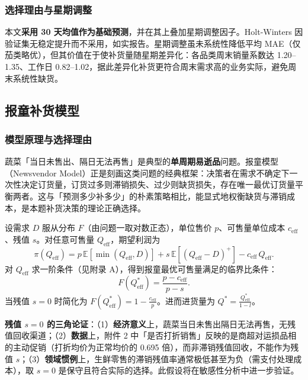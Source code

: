 \documentclass[12pt]{ctexart}
\begin{document}
\subsubsection{选择理由与星期调整}
本文\textbf{采用 30 天均值作为基础预测}，并在其上叠加星期调整因子。Holt-Winters 因验证集无稳定提升而不采用，如实报告。星期调整虽未系统性降低平均 MAE（仅茄类略优），但其价值在于使补货量随星期差异化：各品类周末销量系数达 1.20--1.35、工作日 0.82--1.02，据此差异化补货更符合周末需求高的业务实际，避免周末系统性缺货。

\subsection{报童补货模型}

\subsubsection{模型原理与选择理由}
蔬菜「当日未售出、隔日无法再售」是典型的\textbf{单周期易逝品}问题。报童模型（Newsvendor Model）正是刻画这类问题的经典框架：决策者在需求不确定下一次性决定订货量，订货过多则滞销损失、过少则缺货损失，存在唯一最优订货量平衡两者。这与「预测多少补多少」的朴素策略相比，能显式地权衡缺货与滞销成本，是本题补货决策的理论正确选择。

设需求 $D$ 服从分布 $F$（由问题一取对数正态），单位售价 $p$、可售量单位成本 $c_{\mathrm{eff}}$、残值 $s$。对任意可售量 $Q_{\mathrm{eff}}$，期望利润为
\begin{equation}
\pi(Q_{\mathrm{eff}}) = p\,\mathbb{E}[\min(Q_{\mathrm{eff}},D)] + s\,\mathbb{E}[(Q_{\mathrm{eff}}-D)^+] - c_{\mathrm{eff}}\,Q_{\mathrm{eff}}.
\end{equation}
对 $Q_{\mathrm{eff}}$ 求一阶条件（见附录 A），得到报童最优可售量满足的临界比条件：
\begin{equation}
F(Q_{\mathrm{eff}}^*) = \frac{p - c_{\mathrm{eff}}}{p - s}.
\end{equation}
当残值 $s=0$ 时简化为 $F(Q_{\mathrm{eff}}^*)=1-\frac{c_{\mathrm{eff}}}{p}$。进而进货量为 $Q^*=\frac{Q_{\mathrm{eff}}^*}{1-l}$。

\textbf{残值 $s=0$ 的三角论证}：（1）\textbf{经济意义}上，蔬菜当日未售出隔日无法再售，无残值回收渠道；（2）\textbf{数据}上，附件 2 中「是否打折销售」反映的是商超对运损品相的主动促销（打折均价为正常均价的 0.695 倍），而非滞销残值回收，不能作为残值 $s$；（3）\textbf{领域惯例}上，生鲜零售的滞销残值率通常极低甚至为负（需支付处理成本），取 $s=0$ 是保守且符合实际的选择。此假设将在敏感性分析中进一步验证。
\end{document}
